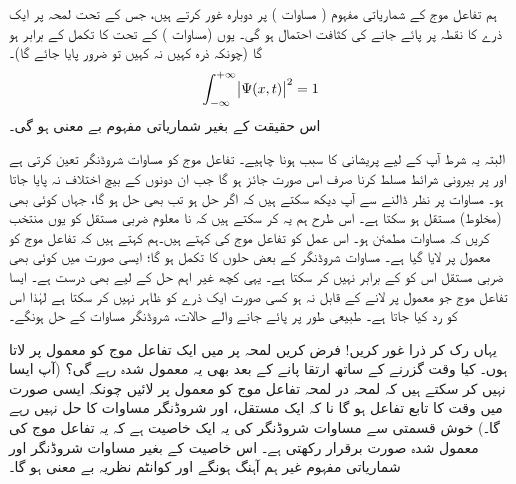 ہم تفاعل موج کے شماریاتی مفہوم ( مساوات ) پر دوبارہ غور کرتے ہیں، جس کے تحت لمحہ   پر ایک ذرے کا نقطہ  پر پائے جانے کی کثافت احتمال  ہو گی۔  یوں  
(مساوات ) کے تحت  کا تکمل  کے برابر ہو گا (چونکہ ذرہ کہیں نہ کہیں تو ضرور پایا جائے گا)۔ 
\begin{align}\label{مساوات_تفاعل_موج_احتمال_اکائی}
\int_{-\infty}^{+\infty}\abs{\Psi(x,t)}^2 = 1
\end{align}
اس حقیقت کے بغیر شماریاتی مفہوم بے معنی ہو گی۔ 

البتہ یہ شرط آپ کے لیے  پریشانی کا سبب ہونا چاہیے۔   تفاعل موج کو مساوات شروڈنگر تعین کرتی ہے اور  پر بیرونی شرائط مسلط کرنا صرف اس صورت جائز ہو گا جب ان دونوں کے بیچ اختلاف نہ پایا جاتا ہو۔ مساوات  پر نظر ڈالنے سے آپ دیکھ سکتے ہیں کہ اگر   حل ہو تب  بھی حل ہو گا، جہاں  کوئی بھی (مخلوط) مستقل ہو سکتا ہے۔ اس طرح ہم یہ کر سکتے ہیں کہ نا معلوم  ضربی مستقل کو یوں منتخب کریں کہ  مساوات   مطمئن ہو۔  اس عمل کو تفاعل موج کی  کہتے ہیں۔ہم کہتے ہیں کہ تفاعل موج کو معمول پر لایا گیا ہے۔ مساوات شروڈنگر کے بعض حلوں کا تکمل  ہو گا؛ ایسی صورت میں کوئی  بھی ضربی مستقل اس کو  کے برابر نہیں کر سکتا ہے۔ یہی کچھ غیر اہم حل  کے لیے بھی درست ہے۔ ایسا تفاعل موج جو معمول پر لانے کے قابل نہ ہو  کسی صورت ایک ذرے کو ظاہر نہیں کر سکتا ہے لہٰذا اس کو رد کیا جاتا ہے۔  طبیعی طور پر پائے جانے والے حالات، شروڈنگر مساوات کے    حل ہونگے۔

 یہاں رک کر ذرا غور کریں!  فرض کریں لمحہ  پر میں ایک تفاعل موج کو معمول پر لاتا ہوں۔ کیا وقت گزرنے کے ساتھ  ارتقا پانے کے بعد بھی یہ معمول شدہ رہے گی؟ (آپ ایسا نہیں کر سکتے ہیں  کہ لمحہ در لمحہ  تفاعل موج کو معمول پر لائیں چونکہ ایسی صورت میں  وقت  کا تابع تفاعل ہو گا نا کہ ایک مستقل، اور  شروڈنگر مساوات کا حل نہیں رہے گا۔) خوش قسمتی سے مساوات شروڈنگر کی یہ ایک خاصیت ہے کہ یہ تفاعل موج  کی معمول شدہ صورت برقرار رکھتی ہے۔ اس خاصیت کے بغیر مساوات شروڈنگر  اور شماریاتی مفہوم غیر ہم آہنگ ہونگے اور  کوانٹم نظریہ بے معنی ہو گا۔

